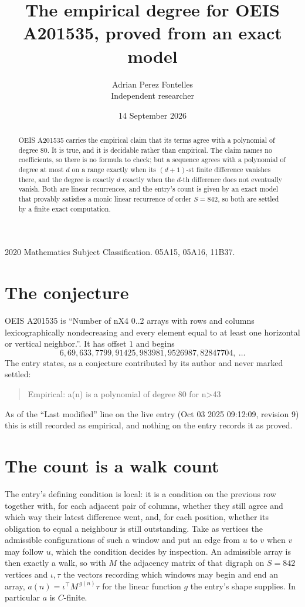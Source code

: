 \documentclass[11pt,a4paper]{article}
\title{The empirical degree for OEIS A201535, proved from an exact model}
\author{Adrian Perez Fontelles\\ \small Independent researcher}
\date{14 September 2026}
\theoremstyle{plain}
\theoremstyle{definition}
\begin{document}
\maketitle

\begin{abstract}
OEIS A201535 carries the empirical claim that its terms agree with a polynomial of degree $80$.
It is true, and it is decidable rather than empirical. The claim names no coefficients, so
there is no formula to check; but a sequence agrees with a polynomial of degree at most $d$ on
a range exactly when its $(d+1)$-st finite difference vanishes there, and the degree is exactly
$d$ exactly when the $d$-th difference does not eventually vanish. Both are linear recurrences,
and the entry's count is given by an exact model that provably satisfies a monic linear
recurrence of order $S=842$, so both are settled by a finite exact computation.
\end{abstract}

\noindent\small 2020 Mathematics Subject Classification. 05A15, 05A16, 11B37.\normalsize

\section{The conjecture}

OEIS A201535 is ``Number of nX4 0..2 arrays with rows and columns lexicographically nondecreasing and every element equal to at least one horizontal or vertical neighbor.''. It has offset $1$ and begins
\[
6, 69, 633, 7799, 91425, 983981, 9526987, 82847704,\ \dots
\]
The entry states, as a conjecture contributed by its author and never marked settled:
\begin{quote}
Empirical: a(n) is a polynomial of degree 80 for n>43
\end{quote}
As of the ``Last modified'' line on the live entry (Oct 03 2025 09:12:09, revision 9)
this is still recorded as empirical, and nothing on the entry records it as proved.

\section{The count is a walk count}

The entry's defining condition is local: it is a condition on the previous row together with, for each adjacent pair of columns, whether they still agree and which way their latest difference went, and, for each position, whether its obligation to equal a neighbour is still outstanding. Take as vertices the
admissible configurations of such a window and put an edge from $u$ to $v$ when $v$ may follow
$u$, which the condition decides by inspection. An admissible array is then exactly a walk, so
with $M$ the adjacency matrix of that digraph on $S=842$ vertices and $\iota,\tau$ the vectors
recording which windows may begin and end an array, $a(n)=\iota^{\!\top}M^{\,g(n)}\tau$ for
the linear function $g$ the entry's shape supplies. In particular $a$ is $C$-finite.
\end{document}
